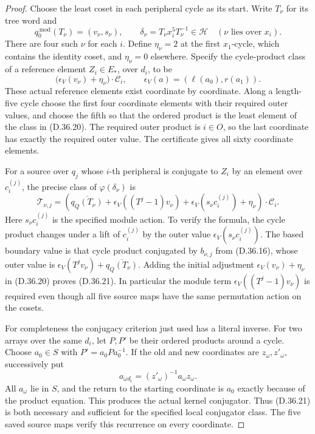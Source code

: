\begin{proof}
Choose the least coset in each peripheral cycle as its start.
Write \(T_\nu\) for its tree word and
\[
 q_0^{\,\mathrm{mod}}(T_\nu)=(v_\nu,s_\nu),\qquad
 \delta_\nu=T_\nu x_i^5T_\nu^{-1}\in\mathcal H
 \quad(\nu\text{ lies over }x_i).
 \tag{D.36.19}
\]
There are four such \(\nu\) for each \(i\).  Define
\(\eta_\nu=2\) at the first \(x_1\)-cycle, which contains
the identity coset, and \(\eta_\nu=0\) elsewhere.
Specify the cycle-product class of a reference element
\(Z_i\in E_*\), over \(d_i\), to be
\[
 \bigl(\epsilon_V(v_\nu)+\eta_\nu\bigr)\cdot\mathcal C_i,
 \qquad
 \epsilon_V(a)=(\ell(a_0),r(a_1)).
 \tag{D.36.20}
\]
These actual reference elements exist coordinate by coordinate.
Along a length-five cycle choose the first four coordinate
elements with their required outer values, and choose the fifth
so that the ordered product is the least element of the class
in \textup{(D.36.20)}.  The required outer product is \(i\in O\),
so the last coordinate has exactly the required outer value.
The certificate gives all sixty coordinate elements.

For a source over \(q_j\) whose \(i\)-th peripheral is conjugate
to \(Z_i\) by an element over \(c_i^{(j)}\), the precise class
of \(\varphi(\delta_\nu)\) is
\[
 \mathcal T_{\nu,j}
  =
 \left(
   \overline{q_Q(T_\nu)}
   +\epsilon_V((T^j-1)v_\nu)
   +\epsilon_V(s_\nu c_i^{(j)})
   +\eta_\nu
 \right)\cdot\mathcal C_i.
 \tag{D.36.21}
\]
Here \(s_\nu c_i^{(j)}\) is the specified module action.
To verify the formula, the cycle product changes under a lift
of \(c_i^{(j)}\) by the outer value
\(\epsilon_V(s_\nu c_i^{(j)})\).  The based boundary value is
that cycle product conjugated by \(b_{\nu,j}\) from
\textup{(D.36.16)}, whose outer value is
\(\epsilon_V(T^jv_\nu)+\overline{q_Q(T_\nu)}\).
Adding the initial adjustment \(\epsilon_V(v_\nu)+\eta_\nu\)
in \textup{(D.36.20)} proves \textup{(D.36.21)}.
In particular the module term
\(\epsilon_V((T^j-1)v_\nu)\) is required even though all five
source maps have the same permutation action on the cosets.

For completeness the conjugacy criterion just used has a literal
inverse.  For two arrays over the same \(d_i\), let \(P,P'\)
be their ordered products around a cycle.  Choose \(a_0\in S\)
with \(P'=a_0Pa_0^{-1}\).  If the old and new coordinates are
\(z_\omega,z'_\omega\), successively put
\[
                  a_{\omega d_i}
                         =(z'_\omega)^{-1}a_\omega z_\omega.
 \tag{D.36.22}
\]
All \(a_\omega\) lie in \(S\), and the return to the starting
coordinate is \(a_0\) exactly because of the product equation.
This produces the actual kernel conjugator.  Thus
\textup{(D.36.21)} is both necessary and sufficient for the
specified local conjugator class.  The five saved source maps
verify this recurrence on every coordinate.


\end{proof}
